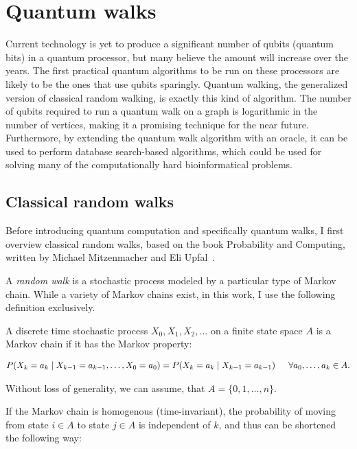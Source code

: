 \section{Quantum walks}

Current technology is yet to produce a significant number of qubits (quantum bits) in a quantum processor, but many believe the amount will increase over the years. The first practical quantum algorithms to be run on these processors are likely to be the ones that use qubits sparingly. Quantum walking, the generalized version of classical random walking, is exactly this kind of algorithm. The number of qubits required to run a quantum walk on a graph is logarithmic in the number of vertices, making it a promising technique for the near future. Furthermore, by extending the quantum walk algorithm with an oracle, it can be used to perform database search-based algorithms, which could be used for solving many of the computationally hard bioinformatical problems.

\subsection{Classical random walks}

Before introducing quantum computation and specifically quantum walks, I first overview classical random walks, based on the book Probability and Computing, written by Michael Mitzenmacher and Eli Upfal~\cite{MitzenmacherProbability}.

A \textit{random walk} is a stochastic process modeled by a particular type of Markov chain. While a variety of Markov chains exist, in this work, I use the following definition exclusively.

\begin{definition}

A discrete time stochastic process $X_0, X_1, X_2, \dots$ on a finite state space $A$ is a Markov chain if it has the Markov property:

\begin{align*}
P(X_k = a_k \mid X_{k-1} = a_{k-1}, \dots, X_0 = a_0) = P(X_k = a_k \mid X_{k-1} = a_{k-1}) \hspace{15pt} \forall a_0,\dots,a_k\in A.
\end{align*}

\end{definition}

Without loss of generality, we can assume, that $A = \{0,1,\dots,n\}$.

If the Markov chain is homogenous (time-invariant), the probability of moving from state $i \in A$ to state $j \in A$ is independent of $k$, and thus can be shortened the following way:

